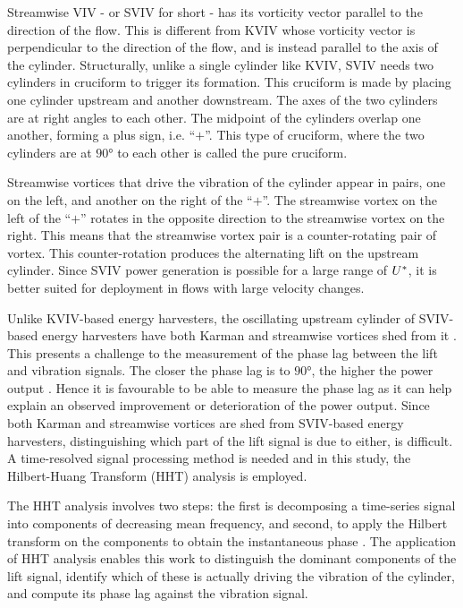 \documentclass[oneside]{utmthesis}
\begin{document}
Streamwise VIV - or SVIV for short - has its vorticity vector parallel to the direction of the flow. This is different from KVIV whose vorticity vector is perpendicular to the direction of the flow, and is instead parallel to the axis of the cylinder. Structurally, unlike a single cylinder like KVIV, SVIV needs two cylinders in cruciform to trigger its formation. This cruciform is made by placing one cylinder upstream and another downstream. The axes of the two cylinders are at right angles to each other. The midpoint of the cylinders overlap one another, forming a plus sign, i.e. ``$+$''. This type of cruciform, where the two cylinders are at $90 \si{\degree}$ to each other is called the pure cruciform.

Streamwise vortices that drive the vibration of the cylinder appear in pairs, one on the left, and another on the right of the ``$+$''. The streamwise vortex on the left of the ``$+$'' rotates in the opposite direction to the streamwise vortex on the right. This means that the streamwise vortex pair is a counter-rotating pair of vortex. This counter-rotation produces the alternating lift on the upstream cylinder. Since SVIV power generation is possible for a large range of $U^{*}$, it is better suited for deployment in flows with large velocity changes.

Unlike KVIV-based energy harvesters, the oscillating upstream cylinder of SVIV-based energy harvesters have both Karman and streamwise vortices shed from it \citep{Koide2017}. This presents a challenge to the measurement of the phase lag between the lift and vibration signals. The closer the phase lag is to $90 \si{\degree}$, the higher the power output \citep{Koide2013,Raghavan2007a}. Hence it is favourable to be able to measure the phase lag as it can help explain an observed improvement or deterioration of the power output. Since both Karman and streamwise vortices are shed from SVIV-based energy harvesters, distinguishing which part of the lift signal is due to either, is difficult. A time-resolved signal processing method is needed and in this study, the Hilbert-Huang Transform (HHT) analysis is employed.

The HHT analysis involves two steps: the first is decomposing a time-series signal into components of decreasing mean frequency, and second, to apply the Hilbert transform on the components to obtain the instantaneous phase \citep{Souza2022}. The application of HHT analysis enables this work to distinguish the dominant components of the lift signal, identify which of these is actually driving the vibration of the cylinder, and compute its phase lag against the vibration signal.
\end{document}
